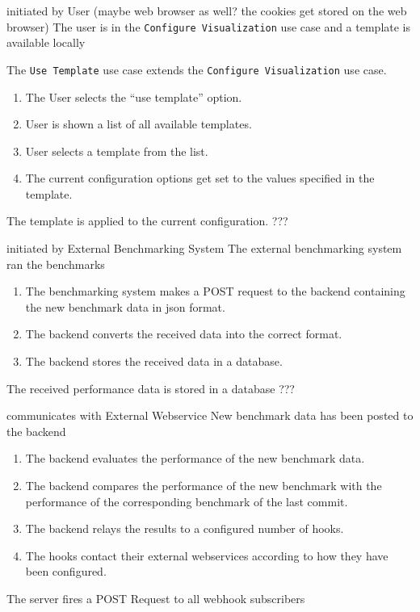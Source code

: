 \bigskip

{initiated by User (maybe web browser as well? the cookies get stored on the web browser)}
{The user is in the \texttt{Configure Visualization} use case and a \gls{template} is available locally}
{The \texttt{Use Template} use case extends the \texttt{Configure Visualization} use case.
\begin{enumerate}
    \item The User selects the \enquote{use template} option.
    \item User is shown a list of all available \glspl{template}.
    \item User selects a \gls{template} from the list.
    \item The current \gls{configuration} options get set to the values specified in the template.
\end{enumerate}} 
{The \gls{template} is applied to the current configuration.}
{???}

\bigskip

{initiated by External Benchmarking System}
{The external benchmarking system ran the benchmarks}
{\begin{enumerate}
    \item The benchmarking system makes a POST request to the backend containing the new benchmark data in \acrshort{json} format.
    \item The backend converts the received data into the correct format.
    \item The backend stores the received data in a database.
\end{enumerate}} 
{The received performance data is stored in a database}
{???}

\bigskip

{communicates with External Webservice}
{New benchmark data has been posted to the backend}
{\begin{enumerate}
    \item The backend evaluates the performance of the new benchmark data.
    \item The backend compares the performance of the new benchmark with the performance of the corresponding benchmark of the last commit.
    \item The backend relays the results to a configured number of hooks.
    \item The hooks contact their external webservices according to how they have been configured.
\end{enumerate}}
{The server fires a POST Request to all webhook subscribers}
{}

